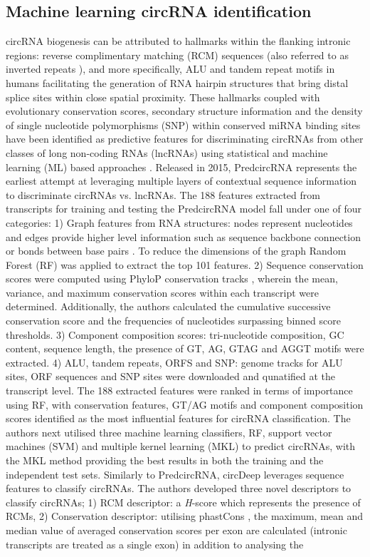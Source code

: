 \documentclass[pdflatex,sn-mathphys-num]{sn-jnl}
\begin{document}
\subsection{Machine learning circRNA identification}
circRNA biogenesis can be attributed to hallmarks within the flanking intronic regions: reverse complimentary matching (RCM) sequences \cite{Ivanov2015Jan} (also referred to as inverted repeats \cite{Dubin1995Dec}), and more specifically, ALU and tandem repeat motifs in humans \cite{Jeck2012Dec} facilitating the generation of RNA hairpin structures that bring distal splice sites within close spatial proximity. These hallmarks coupled with evolutionary conservation scores, secondary structure information and the density of single nucleotide polymorphisms (SNP) within conserved miRNA binding sites \cite{Thomas2014Aug} have been identified as predictive features for discriminating circRNAs from other classes of long non-coding RNAs (lncRNAs) using statistical and machine learning (ML) based approaches \cite{PredcircRNA,circDeep,StackCirRNAPred,CirRNAPL}. Released in 2015, PredcircRNA \cite{PredcircRNA} represents the earliest attempt at leveraging multiple layers of contextual sequence information to discriminate circRNAs vs. lncRNAs. The 188 features extracted from transcripts for training and testing the PredcircRNA model fall under one of four categories: 1) Graph features from RNA structures: nodes represent nucleotides and edges provide higher level information such as sequence backbone connection or bonds between base pairs \cite{GraphProt}. To reduce the dimensions of the graph Random Forest (RF) was applied to extract the top 101 features. 2) Sequence conservation scores were computed using PhyloP conservation tracks \cite{PhyloP}, wherein the mean, variance, and maximum conservation scores within each transcript were determined. Additionally, the authors calculated the cumulative successive conservation score and the frequencies of nucleotides surpassing binned score thresholds. 3) Component composition scores: tri-nucleotide composition, GC content, sequence length, the presence of GT, AG, GTAG and AGGT motifs were extracted. 4) ALU, tandem repeats, ORFS and SNP: genome tracks for ALU sites, ORF sequences and SNP sites were downloaded and qunatified at the transcript level. The 188 extracted features were ranked in terms of importance using RF, with conservation features, GT/AG motifs and component composition scores identified as the most influential features for circRNA classification. The authors next utilised three machine learning classifiers, RF, support vector machines (SVM) and multiple kernel learning (MKL) to predict circRNAs, with the MKL method providing the best results in both the training and the independent test sets. Similarly to PredcircRNA, circDeep \cite{circDeep} leverages sequence features to classify circRNAs. The authors developed three novel descriptors to classify circRNAs; 1) RCM descriptor: a \textit{H}-score which represents the presence of RCMs, 2) Conservation descriptor: utilising phastCons \cite{phastCons}, the maximum, mean and median value of averaged conservation scores per exon are calculated (intronic transcripts are treated as a single exon) in addition to analysing the 
\end{document}
